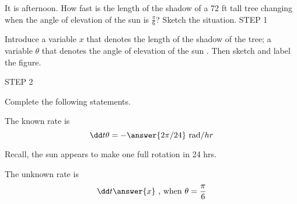 \documentclass{ximera}
\author{Nela Lakos}
\begin{document}
\begin{exercise}

It is afternoon. How fast is the length of the shadow of a 72 ft tall tree changing when the angle of elevation of the sun is $\frac{\pi}{6}$?  Sketch the situation. 
STEP 1

Introduce a variable $x$ that denotes the length of the shadow of the tree; a variable $\theta$ that denotes the angle of elevation of the sun . Then sketch and label the figure.

\begin{hint}
 \begin{image}
  \end{image}
  \end{hint}
  
STEP 2

Complete the following statements.

The known rate is
 \[
\dd t \theta= - \answer{2\pi/24} \text{  rad}/hr
\]
\begin{hint}
Recall, the sun appears to make one full rotation in 24 hrs.
\end{hint}
The unknown rate is
\[
\dd t \answer{x} \text{    , when    } \theta=\frac{\pi}{6}
\]


\end{exercise}
\end{document}
